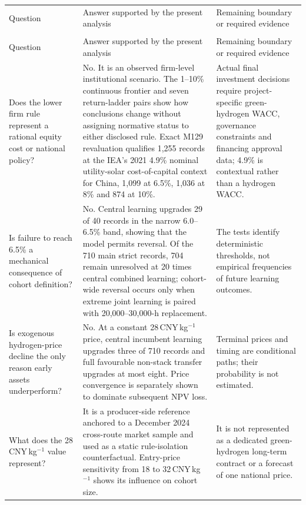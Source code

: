 \documentclass[11pt,a4paper]{article}
\begin{document}
\begingroup
\footnotesize
\setlength{\LTleft}{0pt}
\setlength{\LTright}{0pt}
\begin{longtable}{>{\raggedright\arraybackslash}p{}>{\raggedright\arraybackslash}p{}>{\raggedright\arraybackslash}p{}}
\multicolumn{3}{l}{\label{tab:questionaudit}\textbf{Table S12.} Reviewer-facing interpretation audit.}\\[0.4em]
\toprule
Question & Answer supported by the present analysis & Remaining boundary or required evidence \\
\midrule
\endfirsthead
\multicolumn{3}{l}{\emph{Table S12 continued}}\\
\toprule
Question & Answer supported by the present analysis & Remaining boundary or required evidence \\
\midrule
\endhead
\bottomrule
\endfoot
\bottomrule
\endlastfoot
Does the lower firm rule represent a rational equity cost or national policy? & No. It is an observed firm-level institutional scenario. The 1--10\% continuous frontier and seven return-ladder pairs show how conclusions change without assigning normative status to either disclosed rule. Exact M129 revaluation qualifies 1,255 records at the IEA's 2021 4.9\% nominal utility-solar cost-of-capital context for China, 1,099 at 6.5\%, 1,036 at 8\% and 874 at 10\%. & Actual final investment decisions require project-specific green-hydrogen WACC, governance constraints and financing approval data; 4.9\% is contextual rather than a hydrogen WACC. \\
Is failure to reach 6.5\% a mechanical consequence of cohort definition? & No. Central learning upgrades 29 of 40 records in the narrow 6.0--6.5\% band, showing that the model permits reversal. Of the 710 main strict records, 704 remain unresolved at 20 times central combined learning; cohort-wide reversal occurs only when extreme joint learning is paired with 20,000--30,000-h replacement. & The tests identify deterministic thresholds, not empirical frequencies of future learning outcomes. \\
Is exogenous hydrogen-price decline the only reason early assets underperform? & No. At a constant 28\,CNY\,kg$^{-1}$ price, central incumbent learning upgrades three of 710 records and full favourable non-stack transfer upgrades at most eight. Price convergence is separately shown to dominate subsequent NPV loss. & Terminal prices and timing are conditional paths; their probability is not estimated. \\
What does the 28\,CNY\,kg$^{-1}$ value represent? & It is a producer-side reference anchored to a December 2024 cross-route market sample and used as a static rule-isolation counterfactual. Entry-price sensitivity from 18 to 32\,CNY\,kg$^{-1}$ shows its influence on cohort size. & It is not represented as a dedicated green-hydrogen long-term contract or a forecast of one national price. \\

\end{longtable}
\end{document}
